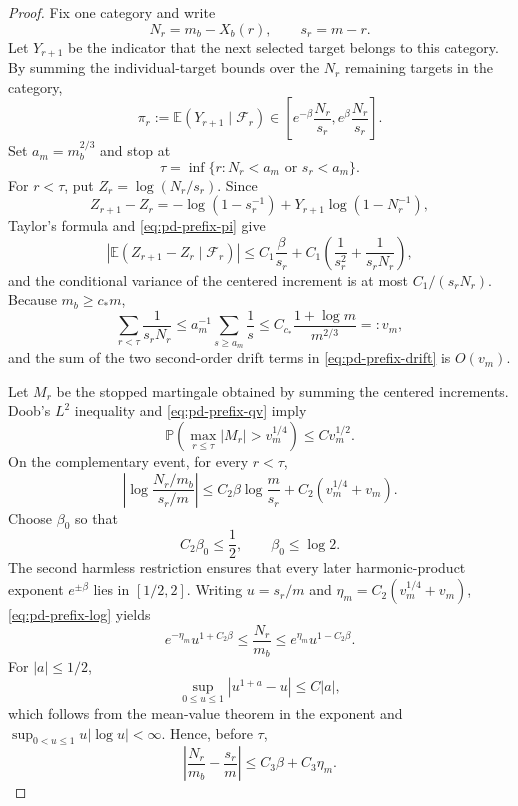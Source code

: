 \documentclass[11pt]{article}
\theoremstyle{remark}
\newcommand{\Pp}{\mathbb P}
\newcommand{\Ee}{\mathbb E}
\begin{document}
\begin{proof}
Fix one category and write
\[
        N_r=m_b-X_b(r),\qquad s_r=m-r.
\]
Let $Y_{r+1}$ be the indicator that the next selected target belongs to this
category.  By summing the individual-target bounds over the $N_r$ remaining
targets in the category,
\[
 \pi_r:=\Ee(Y_{r+1}\mid\mathscr F_r)
 \in\left[e^{-\beta}\frac{N_r}{s_r},
          e^\beta\frac{N_r}{s_r}\right].
 \tag{6.6}\label{eq:pd-prefix-pi}
\]
Set $a_m=m_b^{2/3}$ and stop at
\[
        \tau=\inf\{r:N_r<a_m\text{ or }s_r<a_m\}.
\]
For $r<\tau$, put $Z_r=\log(N_r/s_r)$.  Since
\[
 Z_{r+1}-Z_r
 =-\log(1-s_r^{-1})
  +Y_{r+1}\log(1-N_r^{-1}),
\]
Taylor's formula and \eqref{eq:pd-prefix-pi} give
\[
 \left|\Ee(Z_{r+1}-Z_r\mid\mathscr F_r)\right|
 \le C_1\frac\beta{s_r}
 +C_1\left(\frac1{s_r^2}+\frac1{s_rN_r}\right),
 \tag{6.7}\label{eq:pd-prefix-drift}
\]
and the conditional variance of the centered increment is at most
$C_1/(s_rN_r)$.  Because $m_b\ge c_*m$,
\[
 \sum_{r<\tau}\frac1{s_rN_r}
 \le a_m^{-1}\sum_{s\ge a_m}\frac1s
 \le C_{c_*}\frac{1+\log m}{m^{2/3}}=:v_m,
 \tag{6.8}\label{eq:pd-prefix-qv}
\]
and the sum of the two second-order drift terms in
\eqref{eq:pd-prefix-drift} is $O(v_m)$.

Let $M_r$ be the stopped martingale obtained by summing the centered
increments.  Doob's $L^2$ inequality and \eqref{eq:pd-prefix-qv} imply
\[
 \Pp\left(\max_{r\le\tau}|M_r|>v_m^{1/4}\right)
 \le C v_m^{1/2}.
 \tag{6.9}\label{eq:pd-prefix-doob}
\]
On the complementary event, for every $r<\tau$,
\[
 \left|\log\frac{N_r/m_b}{s_r/m}\right|
 \le C_2\beta\log\frac m{s_r}+C_2(v_m^{1/4}+v_m).
 \tag{6.10}\label{eq:pd-prefix-log}
\]
Choose $\beta_0$ so that
\[
        C_2\beta_0\le\frac12,
        \qquad \beta_0\le\log 2.
\]
The second harmless restriction ensures that every later harmonic-product
exponent $e^{\pm\beta}$ lies in $[1/2,2]$.  Writing $u=s_r/m$ and
$\eta_m=C_2(v_m^{1/4}+v_m)$, \eqref{eq:pd-prefix-log} yields
\[
 e^{-\eta_m}u^{1+C_2\beta}
 \le\frac{N_r}{m_b}
 \le e^{\eta_m}u^{1-C_2\beta}.
 \tag{6.11}\label{eq:pd-prefix-power}
\]
For $|a|\le1/2$,
\[
        \sup_{0\le u\le1}|u^{1+a}-u|\le C|a|,
\]
which follows from the mean-value theorem in the exponent and
$\sup_{0<u\le1}u|\log u|<\infty$.  Hence, before $\tau$,
\[
        \left|\frac{N_r}{m_b}-\frac{s_r}{m}\right|
        \le C_3\beta+C_3\eta_m.
 \tag{6.12}\label{eq:pd-prefix-before-stop}
\]


\end{proof}
\end{document}
